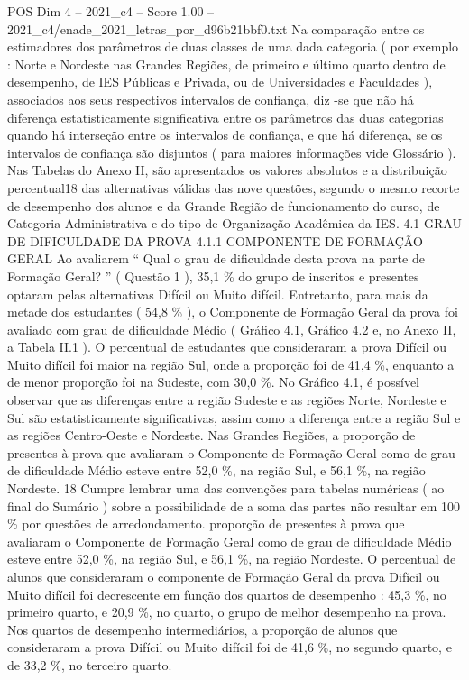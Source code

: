 \begin{textsample}{POS Dim 4 – 2021\_c4 – Score 1.00 – 2021\_c4/enade\_2021\_letras\_por\_d96b21bbf0.txt}
Na comparação entre os estimadores dos parâmetros de duas classes de uma dada categoria ( por exemplo : Norte e Nordeste nas Grandes Regiões, de primeiro e último quarto dentro de desempenho, de IES Públicas e Privada, ou de Universidades e Faculdades ), associados aos seus respectivos intervalos de confiança, diz -se que não há diferença estatisticamente significativa entre os parâmetros das duas categorias quando há interseção entre os intervalos de confiança, e que há diferença, se os intervalos de confiança são disjuntos ( para maiores informações vide Glossário ).
Nas Tabelas do Anexo II, são apresentados os valores absolutos e a distribuição percentual18 das alternativas válidas das nove questões, segundo o mesmo recorte de desempenho dos alunos e da Grande Região de funcionamento do curso, de Categoria Administrativa e do tipo de Organização Acadêmica da IES. 4.1 GRAU DE DIFICULDADE DA PROVA 4.1.1 COMPONENTE DE FORMAÇÃO GERAL Ao avaliarem “ Qual o grau de dificuldade desta prova na parte de Formação Geral? ” ( Questão 1 ), 35,1 \% do grupo de inscritos e presentes optaram pelas alternativas Difícil ou Muito difícil.
Entretanto, para mais da metade dos estudantes ( 54,8 \% ), o Componente de Formação Geral da prova foi avaliado com grau de dificuldade Médio ( Gráfico 4.1, Gráfico 4.2 e, no Anexo II, a Tabela II.1 ).
O percentual de estudantes que consideraram a prova Difícil ou Muito difícil foi maior na região Sul, onde a proporção foi de 41,4 \%, enquanto a de menor proporção foi na Sudeste, com 30,0 \%.
No Gráfico 4.1, é possível observar que as diferenças entre a região Sudeste e as regiões Norte, Nordeste e Sul são estatisticamente significativas, assim como a diferença entre a região Sul e as regiões Centro-Oeste e Nordeste.
Nas Grandes Regiões, a proporção de presentes à prova que avaliaram o Componente de Formação Geral como de grau de dificuldade Médio esteve entre 52,0 \%, na região Sul, e 56,1 \%, na região Nordeste. 18 Cumpre lembrar uma das convenções para tabelas numéricas ( ao final do Sumário ) sobre a possibilidade de a soma das partes não resultar em 100 \% por questões de arredondamento. proporção de presentes à prova que avaliaram o Componente de Formação Geral como de grau de dificuldade Médio esteve entre 52,0 \%, na região Sul, e 56,1 \%, na região Nordeste.
O percentual de alunos que consideraram o componente de Formação Geral da prova Difícil ou Muito difícil foi decrescente em função dos quartos de desempenho : 45,3 \%, no primeiro quarto, e 20,9 \%, no quarto, o grupo de melhor desempenho na prova.
Nos quartos de desempenho intermediários, a proporção de alunos que consideraram a prova Difícil ou Muito difícil foi de 41,6 \%, no segundo quarto, e de 33,2 \%, no terceiro quarto.

\end{textsample}
